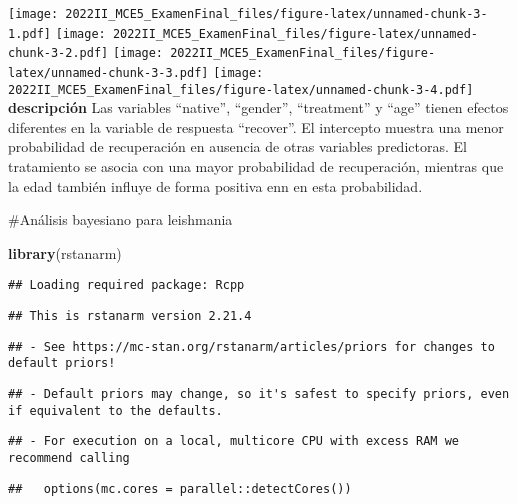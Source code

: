 \documentclass[
]{article}
\newenvironment{Shaded}{\begin{snugshade}}{\end{snugshade}}
\newcommand{\FunctionTok}[1]{\textcolor[rgb]{0.13,0.29,0.53}{\textbf{#1}}}
\newcommand{\NormalTok}[1]{#1}
\begin{document}
\texttt{[image: 2022II\_MCE5\_ExamenFinal\_files/figure-latex/unnamed-chunk-3-1.pdf]}
\texttt{[image: 2022II\_MCE5\_ExamenFinal\_files/figure-latex/unnamed-chunk-3-2.pdf]}
\texttt{[image: 2022II\_MCE5\_ExamenFinal\_files/figure-latex/unnamed-chunk-3-3.pdf]}
\texttt{[image: 2022II\_MCE5\_ExamenFinal\_files/figure-latex/unnamed-chunk-3-4.pdf]}
\textbf{descripción} Las variables ``native'', ``gender'', ``treatment''
y ``age'' tienen efectos diferentes en la variable de respuesta
``recover''. El intercepto muestra una menor probabilidad de
recuperación en ausencia de otras variables predictoras. El tratamiento
se asocia con una mayor probabilidad de recuperación, mientras que la
edad también influye de forma positiva enn en esta probabilidad.

\#Análisis bayesiano para leishmania

\begin{Shaded}
\begin{Highlighting}[]
\FunctionTok{library}\NormalTok{(rstanarm)}
\end{Highlighting}
\end{Shaded}

\begin{verbatim}
## Loading required package: Rcpp
\end{verbatim}

\begin{verbatim}
## This is rstanarm version 2.21.4
\end{verbatim}

\begin{verbatim}
## - See https://mc-stan.org/rstanarm/articles/priors for changes to default priors!
\end{verbatim}

\begin{verbatim}
## - Default priors may change, so it's safest to specify priors, even if equivalent to the defaults.
\end{verbatim}

\begin{verbatim}
## - For execution on a local, multicore CPU with excess RAM we recommend calling
\end{verbatim}

\begin{verbatim}
##   options(mc.cores = parallel::detectCores())
\end{verbatim}
\end{document}
